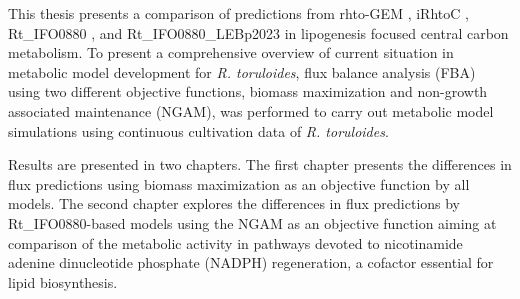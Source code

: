 This thesis presents a comparison of predictions from rhto-GEM \cite{Tiukova2019}, iRhtoC \cite{Dinh2019}, Rt\_IFO0880 \cite{Kim2021}, and Rt\_IFO0880\_LEBp2023 \cite{DeBiaggi2023} in lipogenesis focused central carbon metabolism. 
To present a comprehensive overview of current situation in metabolic model development for \textit{R. toruloides}, flux balance analysis (FBA) using two different objective functions, biomass maximization and non-growth associated maintenance (NGAM), was performed to carry out metabolic model simulations using continuous cultivation data of \textit{R. toruloides}.

Results are presented in two chapters. The first chapter presents the differences in flux predictions using biomass maximization as an objective function by all models. The second chapter explores the differences in flux predictions by Rt\_IFO0880-based models using the NGAM as an objective function aiming at comparison of the metabolic activity in pathways devoted to nicotinamide adenine dinucleotide phosphate (NADPH) regeneration, a cofactor essential for lipid biosynthesis.



